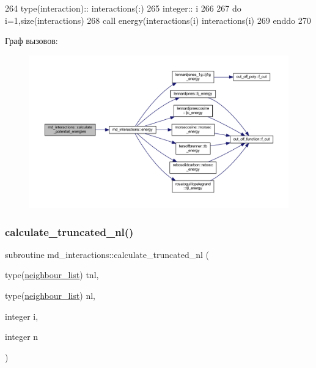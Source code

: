 \begin{DoxyCode}
264     \textcolor{keywordtype}{type}(interaction):: interactions(:)
265     \textcolor{keywordtype}{integer}:: i
266     
267     \textcolor{keywordflow}{do} i=1,\textcolor{keyword}{size}(interactions)
268         \textcolor{keyword}{call }energy(interactions(i)%
      interactions(i)%
269 \textcolor{keywordflow}{    enddo}
270         
\end{DoxyCode}
Граф вызовов\+:\nopagebreak
\begin{figure}[H]
\begin{center}
\leavevmode
\includegraphics[width=350pt]{namespacemd__interactions_a846dbc2db901133c72ff58afb321e918_cgraph}
\end{center}
\end{figure}
\mbox{\label{namespacemd__interactions_abc7ac3a3b1e9382804836d43cdc9a224}} 
\subsubsection{\texorpdfstring{calculate\+\_\+truncated\+\_\+nl()}{calculate\_truncated\_nl()}}
{\footnotesize\ttfamily subroutine md\+\_\+interactions\+::calculate\+\_\+truncated\+\_\+nl (\begin{DoxyParamCaption}\item[{type(\mbox{\hyperlink{structmd__general_1_1neighbour__list}{neighbour\+\_\+list}})}]{tnl,  }\item[{type(\mbox{\hyperlink{structmd__general_1_1neighbour__list}{neighbour\+\_\+list}})}]{nl,  }\item[{integer}]{i,  }\item[{integer}]{n }\end{DoxyParamCaption})}



